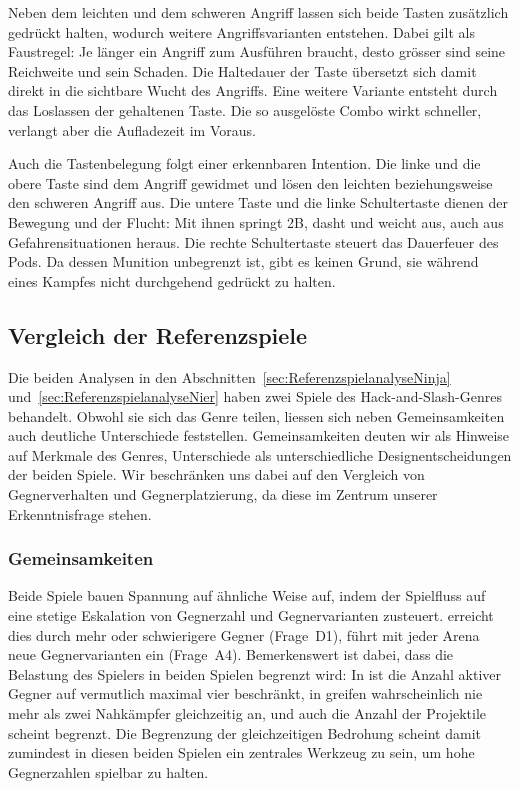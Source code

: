 \documentclass[../Main.tex]{subfiles}
\begin{document}
Neben dem leichten und dem schweren Angriff lassen sich beide Tasten zusätzlich gedrückt halten, wodurch weitere Angriffsvarianten entstehen. Dabei gilt als Faustregel: Je länger ein Angriff zum Ausführen braucht, desto grösser sind seine Reichweite und sein Schaden. Die Haltedauer der Taste übersetzt sich damit direkt in die sichtbare Wucht des Angriffs. Eine weitere Variante entsteht durch das Loslassen der gehaltenen Taste. Die so ausgelöste Combo wirkt schneller, verlangt aber die Aufladezeit im Voraus.

Auch die Tastenbelegung folgt einer erkennbaren Intention. Die linke und die obere Taste sind dem Angriff gewidmet und lösen den leichten beziehungsweise den schweren Angriff aus. Die untere Taste und die linke Schultertaste dienen der Bewegung und der Flucht: Mit ihnen springt 2B, dasht und weicht aus, auch aus Gefahrensituationen heraus. Die rechte Schultertaste steuert das Dauerfeuer des Pods. Da dessen Munition unbegrenzt ist, gibt es keinen Grund, sie während eines Kampfes nicht durchgehend gedrückt zu halten.

\subsection{Vergleich der Referenzspiele} \label{sec:Vergleich}

Die beiden Analysen in den Abschnitten~\ref{sec:ReferenzspielanalyseNinja} und~\ref{sec:ReferenzspielanalyseNier} haben zwei Spiele des Hack-and-Slash-Genres behandelt. Obwohl sie sich das Genre teilen, liessen sich neben Gemeinsamkeiten auch deutliche Unterschiede feststellen. Gemeinsamkeiten deuten wir als Hinweise auf Merkmale des Genres, Unterschiede als unterschiedliche Designentscheidungen der beiden Spiele. Wir beschränken uns dabei auf den Vergleich von Gegnerverhalten und Gegnerplatzierung, da diese im Zentrum unserer Erkenntnisfrage stehen.

\subsubsection{Gemeinsamkeiten}

Beide Spiele bauen Spannung auf ähnliche Weise auf, indem der Spielfluss auf eine stetige Eskalation von Gegnerzahl und Gegnervarianten zusteuert.  erreicht dies durch mehr oder schwierigere Gegner (Frage~D1),  führt mit jeder Arena neue Gegnervarianten ein (Frage~A4). Bemerkenswert ist dabei, dass die Belastung des Spielers in beiden Spielen begrenzt wird: In  ist die Anzahl aktiver Gegner auf vermutlich maximal vier beschränkt, in  greifen wahrscheinlich nie mehr als zwei Nahkämpfer gleichzeitig an, und auch die Anzahl der Projektile scheint begrenzt. Die Begrenzung der gleichzeitigen Bedrohung scheint damit zumindest in diesen beiden Spielen ein zentrales Werkzeug zu sein, um hohe Gegnerzahlen spielbar zu halten.
\end{document}
